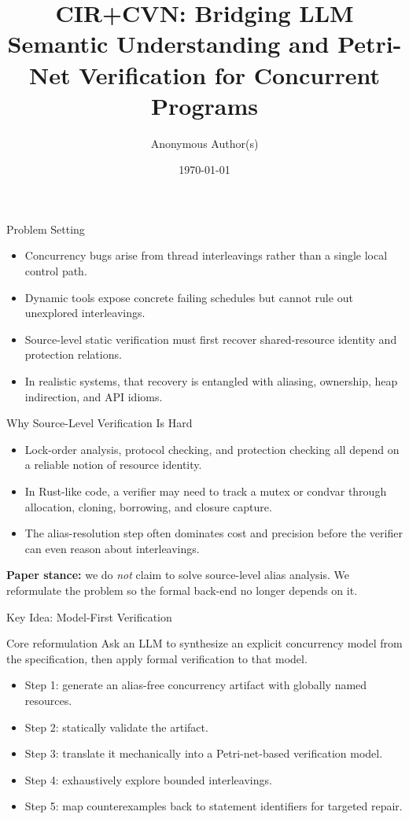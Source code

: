 \documentclass[aspectratio=169]{beamer}
\title[CIR+CVN]{CIR+CVN: Bridging LLM Semantic Understanding and Petri-Net Verification for Concurrent Programs}
\author{Anonymous Author(s)}
\institute{Anonymous Institution}
\date{\today}
\begin{document}
\begin{frame}
  \titlepage
\end{frame}

\begin{frame}{Problem Setting}
  \begin{itemize}
    \item Concurrency bugs arise from thread interleavings rather than a single local control path.
    \item Dynamic tools expose concrete failing schedules but cannot rule out unexplored interleavings.
    \item Source-level static verification must first recover shared-resource identity and protection relations.
    \item In realistic systems, that recovery is entangled with aliasing, ownership, heap indirection, and API idioms.
  \end{itemize}
\end{frame}

\begin{frame}{Why Source-Level Verification Is Hard}
  \begin{itemize}
    \item Lock-order analysis, protocol checking, and protection checking all depend on a reliable notion of resource identity.
    \item In Rust-like code, a verifier may need to track a mutex or condvar through allocation, cloning, borrowing, and closure capture.
    \item The alias-resolution step often dominates cost and precision before the verifier can even reason about interleavings.
  \end{itemize}
  \vspace{0.4em}
  \textbf{Paper stance:} we do \emph{not} claim to solve source-level alias analysis. We reformulate the problem so the formal back-end no longer depends on it.
\end{frame}

\begin{frame}{Key Idea: Model-First Verification}
  \begin{block}{Core reformulation}
    Ask an LLM to synthesize an explicit concurrency model from the specification, then apply formal verification to that model.
  \end{block}
  \begin{itemize}
    \item Step 1: generate an alias-free concurrency artifact with globally named resources.
    \item Step 2: statically validate the artifact.
    \item Step 3: translate it mechanically into a Petri-net-based verification model.
    \item Step 4: exhaustively explore bounded interleavings.
    \item Step 5: map counterexamples back to statement identifiers for targeted repair.
  \end{itemize}
\end{frame}
\end{document}
